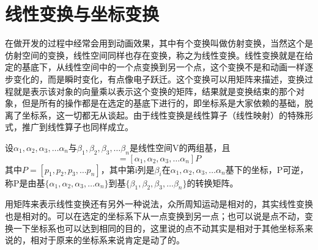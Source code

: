 \documentclass[a4paper, 12pt]{article}
\begin{document}
\section{线性变换与坐标变换}
在做开发的过程中经常会用到动画效果，其中有个变换叫做仿射变换，当然这个是仿射空间的变换，线性空间同样也存在变换，称之为线性变换。线性变换就是在给定的基底下，从线性空间中的一个点变换到另一个点，这个变换不是和动画一样逐步变化的，而是瞬时变化，有点像电子跃迁。这个变换可以用矩阵来描述，变换过程就是表示该对象的向量乘以表示这个变换的矩阵，结果就是变换结束的那个对象，但是所有的操作都是在选定的基底下进行的，即坐标系是大家依赖的基础，脱离了坐标系，这一切都无从谈起。由于线性变换是线性算子（线性映射）的特殊形式，推广到线性算子也同样成立。

设\begin{math}\alpha_{1},\alpha_{2},\alpha_{3},\ldots\alpha_{n}\end{math}与\begin{math}\beta_{1},\beta_{2},\beta_{3},\ldots\beta_{n}\end{math}是线性空间V的两组基，且\begin{displaymath}[\beta_{1},\beta_{2},\beta_{3},\ldots\beta_{n}] = [\alpha_{1},\alpha_{2},\alpha_{3},\ldots\alpha_{n}]P\end{displaymath}其中\begin{math}P = [p_{1},p_{2},p_{3},\ldots p_{n}]\end{math}，其中第i列是\begin{math}\beta_{i}\end{math}在\begin{math}\alpha_{1},\alpha_{2},\alpha_{3},\ldots\alpha_{n}\end{math}基下的坐标，P可逆，称P是由基\begin{math}\{\alpha_{1},\alpha_{2},\alpha_{3},\ldots\alpha_{n}\}\end{math}到基\begin{math}\{\beta_{1},\beta_{2},\beta_{3},\ldots\beta_{n}\}\end{math}的转换矩阵。

用矩阵来表示线性变换还有另外一种说法，众所周知运动是相对的，其实线性变换也是相对的。可以在选定的坐标系下从一点变换到另一点；也可以说是点不动，变换一下坐标系也可以达到相同的目的，这里说的点不动其实是相对于其他坐标系来说的，相对于原来的坐标系来说肯定是动了的。
\end{document}

